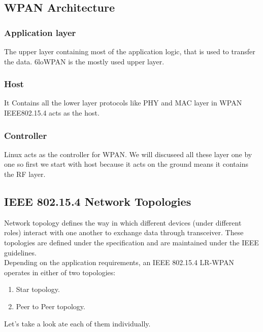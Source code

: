 \subsection{WPAN Architecture}
\subsubsection{Application layer}  The upper layer containing most of the application logic, that is used to transfer the data. 6loWPAN is the mostly used upper layer.
\subsubsection{Host} It Contains all the lower layer protocols like PHY and MAC layer in WPAN IEEE802.15.4 acts as the host.
\subsubsection{Controller}  Linux acts as the controller for WPAN.
We will discuseed all these layer one by one so first we start with host because it acts on the ground means it contains the RF layer.
\subsection{IEEE 802.15.4 Network Topologies}
Network topology defines the way in which different devices (under different roles) interact with one another to exchange data through transceiver. These topologies are defined under the specification and are maintained under the IEEE guidelines.\\
Depending on the application requirements, an IEEE 802.15.4 LR-WPAN operates in either of two topologies:
\begin{enumerate}
	\item Star topology.
	\item Peer to Peer topology.
\end{enumerate}
Let's take a look ate each of them individually.
